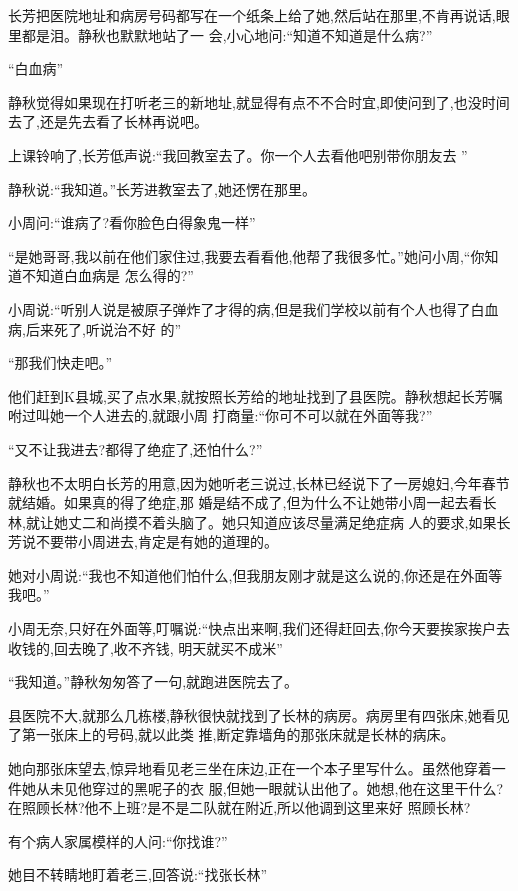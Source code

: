 ﻿\documentclass[12pt]{article}
\begin{document}
长芳把医院地址和病房号码都写在一个纸条上给了她,然后站在那里,不肯再说话,眼里都是泪。静秋也默默地站了一
会,小心地问:``知道不知道是什么病?''

``白血病\myrule ''

静秋觉得如果现在打听老三的新地址,就显得有点不不合时宜,即使问到了,也没时间去了,还是先去看了长林再说吧。

上课铃响了,长芳低声说:``我\myrule 回教室去了。你\myrule 一个人去看他吧\myrule 别带你\myrule 朋友去
\myrule ''

静秋说:``我知道。''长芳进教室去了,她还愣在那里。

小周问:``谁病了?看你脸色白得象鬼一样\myrule ''


``是她哥哥,我以前在他们家住过,我要去看看他,他\myrule 帮了我很多忙。''她问小周,``你知道不知道白血病是
怎么得的?''

小周说:``听别人说是被原子弹炸了才得的病,但是我们学校以前有个人也得了白血病,后来死了,听说\myrule 治不好
的\myrule ''

``那我们快走吧。''

他们赶到K县城,买了点水果,就按照长芳给的地址找到了县医院。静秋想起长芳嘱咐过叫她一个人进去的,就跟小周
打商量:``你可不可以就在外面等我?''

``又不让我进去?都得了绝症了,还怕什么?''

静秋也不太明白长芳的用意,因为她听老三说过,长林已经说下了一房媳妇,今年春节就结婚。如果真的得了绝症,那
婚是结不成了,但为什么不让她带小周一起去看长林,就让她丈二和尚摸不着头脑了。她只知道应该尽量满足绝症病
人的要求,如果长芳说不要带小周进去,肯定是有她的道理的。

她对小周说:``我也不知道他们怕什么,但我朋友刚才就是这么说的,你还是在外面等我吧。''

小周无奈,只好在外面等,叮嘱说:``快点出来啊,我们还得赶回去,你今天要挨家挨户去收钱的,回去晚了,收不齐钱,
明天就买不成米\myrule ''

``我知道。''静秋匆匆答了一句,就跑进医院去了。

县医院不大,就那么几栋楼,静秋很快就找到了长林的病房。病房里有四张床,她看见了第一张床上的号码,就以此类
推,断定靠墙角的那张床就是长林的病床。

她向那张床望去,惊异地看见老三坐在床边,正在一个本子里写什么。虽然他穿着一件她从未见他穿过的黑呢子的衣
服,但她一眼就认出他了。她想,他在这里干什么?在照顾长林?他不上班?是不是二队就在附近,所以他调到这里来好
照顾长林?

有个病人家属模样的人问:``你找谁?''

她目不转睛地盯着老三,回答说:``找张长林\myrule ''
\end{document}
